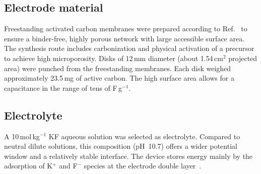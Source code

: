 \subsection{Electrode material}
Freestanding activated carbon membranes were prepared according to Ref.~\cite{Tribbia2020} to ensure a binder-free, highly porous network with large accessible surface area. The synthesis route includes carbonization and physical activation of a precursor to achieve high microporosity. 
Disks of 12\,mm diameter (about 1.54\,cm$^2$ projected area) were punched from the freestanding membranes. Each disk weighed approximately 23.5\,mg of active carbon. The high surface area allows for a capacitance in the range of tens of F\,g$^{-1}$.

\subsection{Electrolyte}
A 10\,mol\,kg$^{-1}$ KF aqueous solution was selected as electrolyte. Compared to neutral dilute solutions, this composition (pH~10.7) offers a wider potential window and a relatively stable interface. The device stores energy mainly by the adsorption of K$^+$ and F$^-$ species at the electrode double layer~\cite{Pianta2023}.

